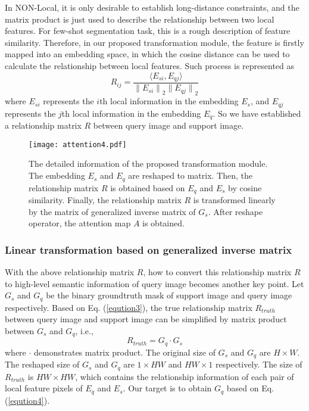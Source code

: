 \documentclass[runningheads]{llncs}
\begin{document}
 
In NON-Local\cite{ref_non_local}, it is only desirable to establish long-distance constraints, and the matrix product is just used to describe the relationship between two local features. For few-shot segmentation task, this is a rough description of feature similarity. Therefore, in our proposed transformation module, the feature is firstly mapped into an embedding space, in which the cosine distance can be used to calculate the relationship between local features. Such process is represented as
\begin{equation}
 R_{ij} = \frac{\langle E_{si},E_{qj} \rangle}{{\|E_{si}\|}_2 {\|E_{qj}\|}_2}\label{eqution3}
\end{equation}
where $E_{si}$ represents the $i$th local information in the embedding $E_{s}$, and $E_{qj}$ represents the $j$th local information in the embedding $E_{q}$. So we have established a relationship matrix $R$ between query image and support image.
 
\begin{figure}
\texttt{[image: attention4.pdf]}
\caption{The detailed information of the proposed transformation module. The embedding $E_s$ and $E_q$ are reshaped to matrix. Then, the relationship matrix $R$ is obtained based on $E_q$ and $E_s$ by cosine similarity. Finally, the relationship matrix $R$ is transformed linearly by the matrix of generalized inverse matrix of $G_s$. After reshape operator, the attention map $A$ is obtained.} \label{fig2}
\end{figure}

\subsubsection{Linear transformation based on generalized inverse matrix}
With the above relationship matrix $R$, how to convert this relationship matrix $R$ to high-level semantic information of query image becomes another key point. 
Let $G_s$ and $G_q$ be the binary groundtruth mask of support image and query image respectively. Based on Eq. (\ref{eqution3}), the true relationship matrix $R_{truth}$ between query image and support image can be simplified by matrix product between $G_s$ and $G_q$, i.e.,
\begin{equation}
 R_{truth} = G_{q} \cdot G_{s}
\label{eqution4}
\end{equation}
where $\cdot$ demonstrates matrix product. The original size of $G_s$ and $G_q$ are $H \times W$. The reshaped size of $G_s$ and $G_q$ are $1 \times HW$ and $HW \times 1$ respectively. The size of $R_{truth}$ is $HW \times HW$, which contains the relationship information of each pair of local feature pixels of $E_{q}$ and $E_{s}$. Our target is to obtain $G_{q}$ based on Eq. (\ref{eqution4}).
\end{document}
